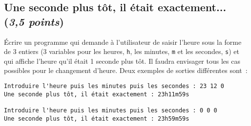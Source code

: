\subsection{Une seconde plus tôt, il était exactement... (\textit{3,5 points})}

Écrire un programme qui demande à l'utilisateur de saisir l'heure sous la forme de 3 entiers (3 variables pour les heures, \verb|h|, les minutes,
\verb|m| et les secondes, \verb|s|) et qui affiche l'heure qu'il était 1
seconde plus tôt. Il faudra envisager tous les
cas possibles pour le changement d'heure. Deux exemples de sorties différentes sont~:

\begin{small}
\begin{verbatim}
Introduire l'heure puis les minutes puis les secondes : 23 12 0
Une seconde plus tôt, il était exactement : 23h11m59s

Introduire l'heure puis les minutes puis les secondes : 0 0 0
Une seconde plus tôt, il était exactement : 23h59m59s
\end{verbatim}
\end{small}
